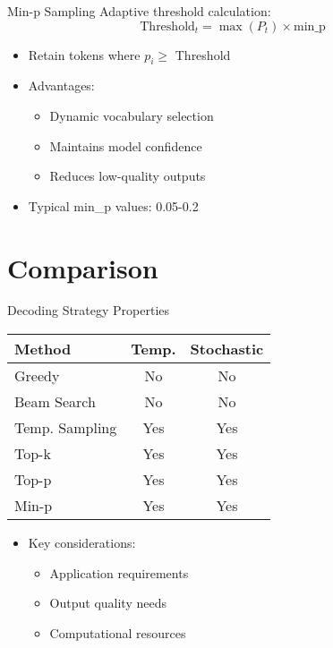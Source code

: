 \begin{frame}{Min-p Sampling}
Adaptive threshold calculation:
\[
\text{Threshold}_t = \max(P_t) \times \text{min\_p}
\]
\begin{itemize}
\item Retain tokens where $p_i \geq$ Threshold
\item Advantages:
\begin{itemize}
\item Dynamic vocabulary selection
\item Maintains model confidence
\item Reduces low-quality outputs
\end{itemize}
\item Typical min\_p values: 0.05-0.2
\end{itemize}
\end{frame}

\section{Comparison}

\begin{frame}{Decoding Strategy Properties}
\begin{table}
\centering
\begin{tabular}{lcc}
\textbf{Method} & \textbf{Temp.} & \textbf{Stochastic} \\ \hline
Greedy & No & No \\
Beam Search & No & No \\
Temp. Sampling & Yes & Yes \\
Top-k & Yes & Yes \\
Top-p & Yes & Yes \\
Min-p & Yes & Yes \\
\end{tabular}
\end{table}
\begin{itemize}
\item Key considerations:
\begin{itemize}
\item Application requirements
\item Output quality needs
\item Computational resources
\end{itemize}
\end{itemize}
\end{frame}